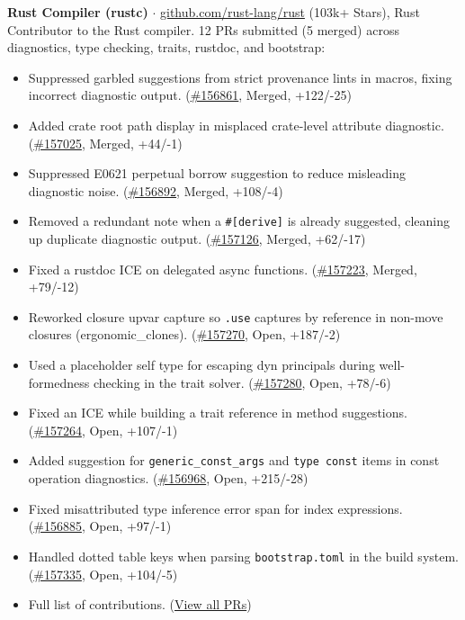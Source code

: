 \documentclass[10pt,a4paper]{article}
\begin{document}
\vspace{4pt}
\noindent\textbf{\footnotesize Rust Compiler (rustc)} {\footnotesize $\cdot$ \href{https://github.com/rust-lang/rust}{github.com/rust-lang/rust} (103k+ Stars), Rust}\\
{\footnotesize Contributor to the Rust compiler. 12 PRs submitted (5 merged) across diagnostics, type checking, traits, rustdoc, and bootstrap:}
\begin{itemize}
    \item {\footnotesize Suppressed garbled suggestions from strict provenance lints in macros, fixing incorrect diagnostic output. (\href{https://github.com/rust-lang/rust/pull/156861}{\#156861}, Merged, +122/-25)}
    \item {\footnotesize Added crate root path display in misplaced crate-level attribute diagnostic. (\href{https://github.com/rust-lang/rust/pull/157025}{\#157025}, Merged, +44/-1)}
    \item {\footnotesize Suppressed E0621 perpetual borrow suggestion to reduce misleading diagnostic noise. (\href{https://github.com/rust-lang/rust/pull/156892}{\#156892}, Merged, +108/-4)}
    \item {\footnotesize Removed a redundant note when a \texttt{\#[derive]} is already suggested, cleaning up duplicate diagnostic output. (\href{https://github.com/rust-lang/rust/pull/157126}{\#157126}, Merged, +62/-17)}
    \item {\footnotesize Fixed a rustdoc ICE on delegated async functions. (\href{https://github.com/rust-lang/rust/pull/157223}{\#157223}, Merged, +79/-12)}
    \item {\footnotesize Reworked closure upvar capture so \texttt{.use} captures by reference in non-move closures (ergonomic\_clones). (\href{https://github.com/rust-lang/rust/pull/157270}{\#157270}, Open, +187/-2)}
    \item {\footnotesize Used a placeholder self type for escaping dyn principals during well-formedness checking in the trait solver. (\href{https://github.com/rust-lang/rust/pull/157280}{\#157280}, Open, +78/-6)}
    \item {\footnotesize Fixed an ICE while building a trait reference in method suggestions. (\href{https://github.com/rust-lang/rust/pull/157264}{\#157264}, Open, +107/-1)}
    \item {\footnotesize Added suggestion for \texttt{generic\_const\_args} and \texttt{type const} items in const operation diagnostics. (\href{https://github.com/rust-lang/rust/pull/156968}{\#156968}, Open, +215/-28)}
    \item {\footnotesize Fixed misattributed type inference error span for index expressions. (\href{https://github.com/rust-lang/rust/pull/156885}{\#156885}, Open, +97/-1)}
    \item {\footnotesize Handled dotted table keys when parsing \texttt{bootstrap.toml} in the build system. (\href{https://github.com/rust-lang/rust/pull/157335}{\#157335}, Open, +104/-5)}
    \item {\footnotesize Full list of contributions. (\href{https://github.com/rust-lang/rust/pulls?q=author\%3ADnreikronos}{View all PRs})}
\end{itemize}
\end{document}
